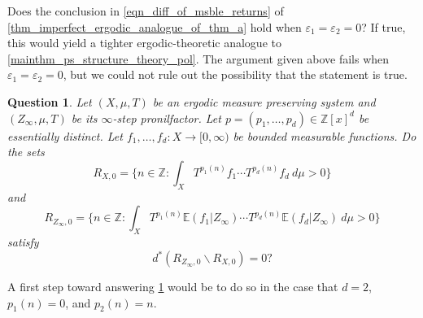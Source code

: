 \documentclass{article}
\theoremstyle{plain}
\newtheorem{question}[Theorem]{Question}
\theoremstyle{claim}
\theoremstyle{definition}
\theoremstyle{plain}
\theoremstyle{plain}
\newcommand{\Z}{\mathbb{Z}}
\renewcommand{\epsilon}{\varepsilon}
\renewcommand{\setminus}{\backslash}
\newcommand{\E}{\mathbb{E}}
\newcommand{\eps}{\epsilon}
\newcommand{\1}{\boldsymbol{1}}
\begin{document}
Does the conclusion in \eqref{eqn_diff_of_msble_returns} of \cref{thm_imperfect_ergodic_analogue_of_thm_a} hold when $\eps_1 =\eps_2 = 0$?  If true, this would yield a tighter ergodic-theoretic analogue to \cref{mainthm_ps_structure_theory_pol}.  The argument given above fails when $\eps_1 =\eps_2 = 0$, but we could not rule out the possibility that the statement is true.

\begin{question}
\label{quest_ergodic_analogue}
    Let $(X, \mu, T)$ be an ergodic measure preserving system and $(Z_{\infty}, \mu, T)$ be its $\infty$-step pronilfactor. Let $p = (p_1, \ldots, p_d) \in \Z[x]^d$ be essentially distinct. Let $f_1, \ldots, f_d: X \to [0,\infty)$ be bounded measurable functions. Do the sets
\[
    R_{X,0} = \bigg\{n \in \Z: \int_X T^{p_1(n)} f_1 \cdots T^{p_d(n)} f_d \ d \mu > 0\bigg\}
\]
and
\[
    R_{Z_{\infty}, 0} = \bigg\{n \in \Z: \int_X T^{p_1(n)} \E(f_1|Z_{\infty}) \cdots T^{p_d(n)} \E(f_d|Z_{\infty}) \ d \mu > 0\bigg\}
\]
satisfy 
\[
    d^*(R_{Z_{\infty}, 0} \setminus R_{X,0}) = 0?
\]
\end{question}

A first step toward answering \cref{quest_ergodic_analogue} would be to do so in the case that $d=2$, $p_1(n) = 0$, and $p_2(n) = n$.



\end{document}
